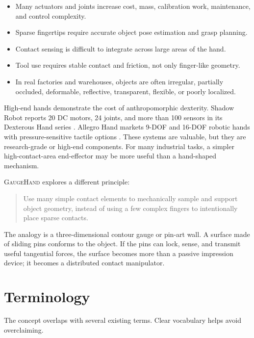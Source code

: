 \documentclass[11pt]{article}
\newcommand{\GaugeHand}{\textsc{GaugeHand}}
\begin{document}
\begin{itemize}[leftmargin=*]
  \item Many actuators and joints increase cost, mass, calibration work, maintenance, and control complexity.
  \item Sparse fingertips require accurate object pose estimation and grasp planning.
  \item Contact sensing is difficult to integrate across large areas of the hand.
  \item Tool use requires stable contact and friction, not only finger-like geometry.
  \item In real factories and warehouses, objects are often irregular, partially occluded, deformable, reflective, transparent, flexible, or poorly localized.
\end{itemize}

High-end hands demonstrate the cost of anthropomorphic dexterity. Shadow Robot reports 20 DC motors, 24 joints, and more than 100 sensors in its Dexterous Hand series \cite{shadow_dexterous_hand}. Allegro Hand markets 9-DOF and 16-DOF robotic hands with pressure-sensitive tactile options \cite{allegro_hand}. These systems are valuable, but they are research-grade or high-end components. For many industrial tasks, a simpler high-contact-area end-effector may be more useful than a hand-shaped mechanism.

\GaugeHand{} explores a different principle:

\begin{quote}
Use many simple contact elements to mechanically sample and support object geometry, instead of using a few complex fingers to intentionally place sparse contacts.
\end{quote}

The analogy is a three-dimensional contour gauge or pin-art wall. A surface made of sliding pins conforms to the object. If the pins can lock, sense, and transmit useful tangential forces, the surface becomes more than a passive impression device; it becomes a distributed contact manipulator.

\section{Terminology}

The concept overlaps with several existing terms. Clear vocabulary helps avoid overclaiming.
\end{document}
